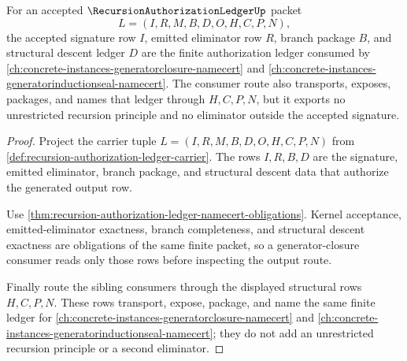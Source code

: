 \begin{theorem}
\label{thm:recursion-authorization-ledger-generator-closure-sibling-route}
For an accepted $\RecursionAuthorizationLedgerUp$ packet
$$
L=(I,R,M,B,D,O,H,C,P,N),
$$
the accepted signature row $I$, emitted eliminator row $R$, branch package $B$, and structural descent ledger $D$ are the finite authorization ledger consumed by \autoref{ch:concrete-instances-generatorclosure-namecert} and \autoref{ch:concrete-instances-generatorinductionseal-namecert}. The consumer route also transports, exposes, packages, and names that ledger through $H,C,P,N$, but it exports no unrestricted recursion principle and no eliminator outside the accepted signature.
\end{theorem}
\begin{proof}
Project the carrier tuple $L=(I,R,M,B,D,O,H,C,P,N)$ from \autoref{def:recursion-authorization-ledger-carrier}. The rows $I,R,B,D$ are the signature, emitted eliminator, branch package, and structural descent data that authorize the generated output row.

Use \autoref{thm:recursion-authorization-ledger-namecert-obligations}. Kernel acceptance, emitted-eliminator exactness, branch completeness, and structural descent exactness are obligations of the same finite packet, so a generator-closure consumer reads only those rows before inspecting the output route.

Finally route the sibling consumers through the displayed structural rows $H,C,P,N$. These rows transport, expose, package, and name the same finite ledger for \autoref{ch:concrete-instances-generatorclosure-namecert} and \autoref{ch:concrete-instances-generatorinductionseal-namecert}; they do not add an unrestricted recursion principle or a second eliminator.
\end{proof}

